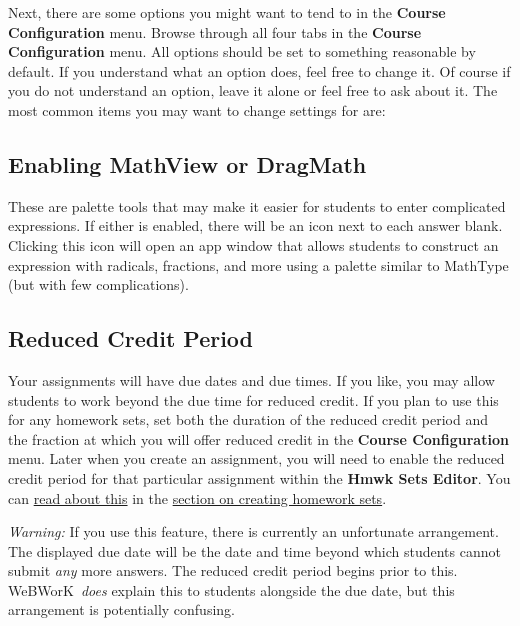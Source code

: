 \documentclass[12pt]{article}
\newcommand{\menu}[1]{\textbf{#1}}
\newcommand{\WW}{WeBWorK}
\newcommand{\HSE}{\menu{Hmwk Sets Editor}}
\newcommand{\FM}{\menu{File Manager}}
\begin{document}

Next, there are some options you might want to tend to in the \menu{Course Configuration} menu.  Browse through all four tabs in the  \menu{Course Configuration} menu. All options should be set to something reasonable by default. If you understand what an option does, feel free to change it. Of course if you do not understand an option, leave it alone or feel free to ask about it. The most common items you may want to change settings for are:

\subsection{Enabling MathView or DragMath}

These are palette tools that may make it easier for students to enter complicated expressions. If either is enabled, there will be an icon next to each answer blank. Clicking this icon will open an app window that allows students to construct an expression with radicals, fractions, and more using a palette similar to MathType (but with few complications).

\subsection{Reduced Credit Period}

Your assignments will have due dates and due times. If you like, you may allow students to work beyond the due time for reduced credit. If you plan to use this for any homework sets, set both the duration of the reduced credit period and the fraction at which you will offer reduced credit in the \menu{Course Configuration} menu. Later when you create an assignment, you will need to enable the reduced credit period for that particular assignment within the \HSE. You can \hyperref[reducedcredit]{read about this} in the \hyperref[makeset]{section on creating homework sets}. 

\emph{Warning:} If you use this feature, there is currently an unfortunate arrangement. The displayed due date will be the date and time beyond which students cannot submit \emph{any} more answers. The reduced credit period begins prior to this.  \WW\ \emph{does} explain this to students alongside the due date, but this arrangement is potentially confusing.
\end{document}
